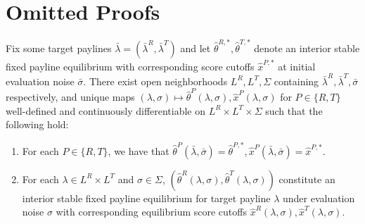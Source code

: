 \newpage
\section{Omitted Proofs}

\begin{lemma}\label{lemma:existence_payline_toeqm}
Fix some target paylines $\bar{\lambda} = (\bar{\lambda}^R,\bar{\lambda}^T)$ and let $\hat{\theta}^{R,*},\hat{\theta}^{T,*}$ denote an interior stable fixed payline equilibrium with corresponding score cutoffs $\hat{x}^{P,*}$ at initial evaluation noise $\bar{\sigma}$. There exist open neighborhoods $L^R, L^T, \Sigma$ containing $\bar{\lambda}^R,\bar{\lambda}^T,\bar{\sigma}$ respectively, and unique maps $(\lambda,\sigma)\mapsto \hat{\theta}^P(\lambda,\sigma),\hat{x}^P(\lambda,\sigma)$ for $P\in \{R,T\}$ well-defined and continuously differentiable on $L^R\times L^T\times \Sigma$ such that the following hold:
\vspace{-5pt}
\begin{enumerate}[label=(\arabic*),ref=\thelemma(\arabic*)]
  \item For each $P\in \{R,T\}$, we have that $\hat{\theta}^{P}(\bar{\lambda},\bar{\sigma}) = \hat{\theta}^{P,*}, \hat{x}^P(\bar{\lambda},\bar{\sigma}) = \hat{x}^{P,*}$.
   \item For each $\lambda\in L^R\times L^T$ and $\sigma\in \Sigma$, $(\hat{\theta}^{R}(\lambda,\sigma),\hat{\theta}^T(\lambda,\sigma))$ constitute an interior stable fixed payline equilibrium for target payline $\lambda$ under evaluation noise $\sigma$ with corresponding equilibrium score cutoffs $\hat{x}^R(\lambda,\sigma),\hat{x}^T(\lambda,\sigma)$. 
\end{enumerate}
\end{lemma}

